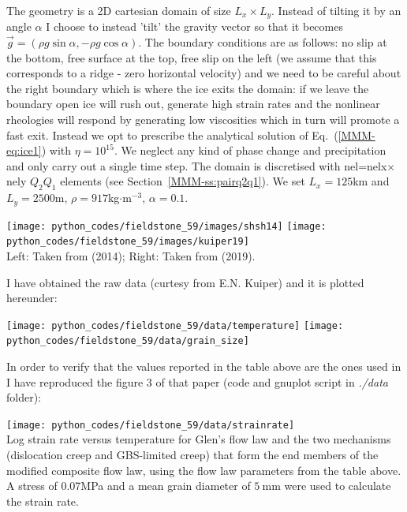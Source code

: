 The geometry is a 2D cartesian domain of size $L_x \times L_y$. Instead of tilting it by an angle $\alpha$
I choose to instead 'tilt' the gravity vector so that it becomes 
$\vec{g}=(\rho g \sin\alpha,-\rho g\cos\alpha)$.
The boundary conditions are as follows: no slip at the bottom, free surface at the top, 
free slip on the left (we assume that this corresponds to a ridge - zero horizontal velocity)
and we need to be careful about the right boundary which is where the ice exits the domain:
if we leave the boundary open ice will rush out, generate high strain rates and the nonlinear 
rheologies will respond by generating low viscosities which in turn will promote a fast 
exit. Instead we opt to prescribe the analytical solution of Eq.~(\ref{MMM-eq:ice1}) with $\eta=10^{15}$.
We neglect any kind of phase change and precipitation and only carry out a single time step.
The domain is discretised with nel=nelx$\times$nely $Q_2Q_1$ elements (see Section~\ref{MMM-ss:pairq2q1}).
We set $L_x=125$km and $L_y=2500$m, $\rho=917$kg$\cdot$m$^{-3}$, $\alpha=0.1$\degree.



\begin{center}
\texttt{[image: python\_codes/fieldstone\_59/images/shsh14]}
\texttt{[image: python\_codes/fieldstone\_59/images/kuiper19]}\\
{\captionfont Left: Taken from \textcite{shsh14} (2014); 
Right: Taken from \textcite{kuiper19} (2019).}
\end{center}

I have obtained the raw data (curtesy from E.N. Kuiper) and it is plotted hereunder:
\begin{center}
\texttt{[image: python\_codes/fieldstone\_59/data/temperature]}
\texttt{[image: python\_codes/fieldstone\_59/data/grain\_size]}
\end{center}

In order to verify that the values reported in the table above are the ones 
used in \cite{kudd19} I have reproduced the figure 3 of that paper (code and gnuplot
script in {\sl ./data} folder):
\begin{center}
\texttt{[image: python\_codes/fieldstone\_59/data/strainrate]}\\
{\captionfont Log strain rate versus temperature for Glen's flow law and 
the two mechanisms (dislocation creep and GBS-limited creep) that form the end members 
of the modified composite flow law, using the flow law parameters from the table above. 
A stress of 0.07MPa and a mean grain diameter of $5~\si{\milli\meter}$ 
were used to calculate the strain rate.}
\end{center}


